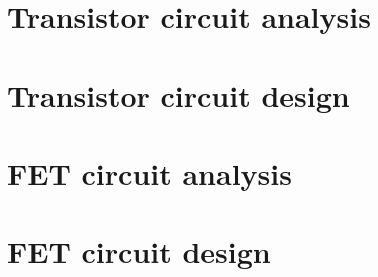 \chapter{Transistor circuit analysis}
\label{Transistor circuit analysis}

\chapter{Transistor circuit design}
\label{Transistor circuit design}

\chapter{FET circuit analysis}
\label{FET circuit analysis}

\chapter{FET circuit design}
\label{FET circuit design}